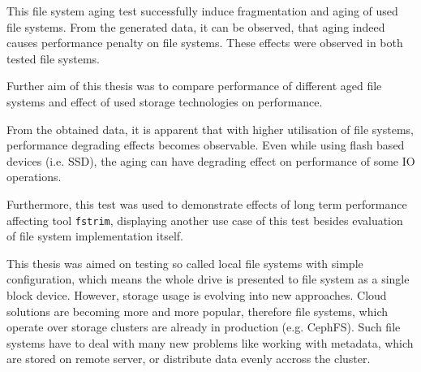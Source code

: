 \documentclass[
  color, %
  table, %
  lof,   %
  lot,   %
]{fithesis3}
\begin{document}
This file system aging test successfully induce fragmentation and aging of used file systems. From the generated data, it can be observed, that aging indeed causes performance penalty on file systems. These effects were observed in both tested file systems.





Further aim of this thesis was to compare performance of different aged file systems and effect of used storage technologies on performance.

From the obtained data, it is apparent that with higher utilisation of file systems, performance degrading effects becomes observable. Even while using flash based devices (i.e. SSD), the aging can have degrading effect on performance of some IO operations.


Furthermore, this test was used to demonstrate effects of long term performance affecting tool \texttt{fstrim}, displaying another use case of this test besides evaluation of file system implementation itself.


This thesis was aimed on testing so called local file systems with simple configuration, which means the whole drive is presented to file system as a single block device. However, storage usage is evolving into new approaches. Cloud solutions are becoming more and more popular, therefore file systems, which operate over storage clusters are already in production (e.g. CephFS\footnotemark[1]). Such file systems have to deal with many new problems like working with metadata, which are stored on remote server, or distribute data evenly accross the cluster.
\end{document}
